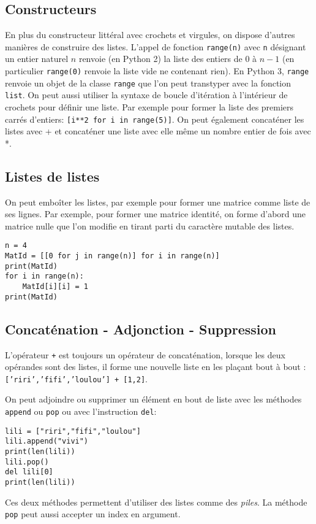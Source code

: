 \subsection{Constructeurs}
En plus du constructeur littéral avec crochets et virgules, on dispose d'autres manières de construire des listes.\newline
L'appel de fonction \verb|range(n)| avec \verb|n| désignant un entier naturel $n$ renvoie (en Python 2) la liste des entiers de $0$ à $n-1$ (en particulier \verb|range(0)| renvoie la liste vide ne contenant rien). En Python 3, \texttt{range} renvoie un objet de la classe \texttt{range} que l'on peut transtyper avec la fonction \texttt{list}.\newline
On peut aussi utiliser la syntaxe de boucle d'itération à l'intérieur de crochets pour définir une liste. Par exemple pour former la liste des premiers carrés d'entiers: \verb|[i**2 for i in range(5)]|.\newline
On peut également concaténer les listes avec + et concaténer une liste avec elle même un nombre entier de fois avec *.

\subsection{Listes de listes}
On peut emboîter les listes, par exemple pour former une matrice comme liste de ses lignes.\newline
Par exemple, pour former une matrice identité, on forme d'abord une matrice nulle que l'on modifie en tirant parti du caractère mutable des listes.
\begin{verbatim}
n = 4
MatId = [[0 for j in range(n)] for i in range(n)]
print(MatId)
for i in range(n):
    MatId[i][i] = 1
print(MatId)\end{verbatim}

\subsection{Concaténation - Adjonction - Suppression}
L'opérateur \texttt{+} est toujours un opérateur de concaténation, lorsque les deux opérandes sont des listes, il forme une nouvelle liste en les plaçant bout à bout : \newline\texttt{['riri','fifi','loulou'] + [1,2]}.

On peut adjoindre ou supprimer un élément en bout de liste avec les méthodes \texttt{append} ou \texttt{pop} ou avec l'instruction \texttt{del}:
\begin{verbatim}
lili = ["riri","fifi","loulou"]
lili.append("vivi")
print(len(lili))
lili.pop()
del lili[0]
print(len(lili))\end{verbatim}
Ces deux méthodes permettent d'utiliser des listes comme des \emph{piles}. La méthode \texttt{pop} peut aussi accepter un index en argument.


